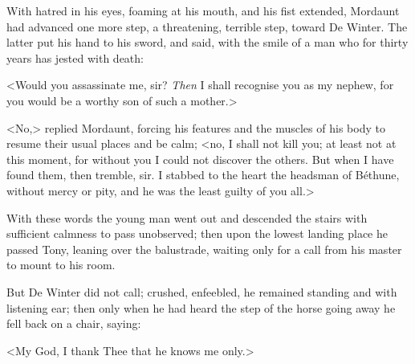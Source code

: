 With hatred in his eyes, foaming at his mouth, and his fist extended, Mordaunt had advanced one more step, a threatening, terrible step, toward De Winter. The latter put his hand to his sword, and said, with the smile of a man who for thirty years has jested with death:

<Would you assassinate me, sir? \emph{Then} I shall recognise you as my nephew, for you would be a worthy son of such a mother.>

<No,> replied Mordaunt, forcing his features and the muscles of his body to resume their usual places and be calm; <no, I shall not kill you; at least not at this moment, for without you I could not discover the others. But when I have found them, then tremble, sir. I stabbed to the heart the headsman of Béthune, without mercy or pity, and he was the least guilty of you all.>

With these words the young man went out and descended the stairs with sufficient calmness to pass unobserved; then upon the lowest landing place he passed Tony, leaning over the balustrade, waiting only for a call from his master to mount to his room.

But De Winter did not call; crushed, enfeebled, he remained standing and with listening ear; then only when he had heard the step of the horse going away he fell back on a chair, saying:

<My God, I thank Thee that he knows me only.> 